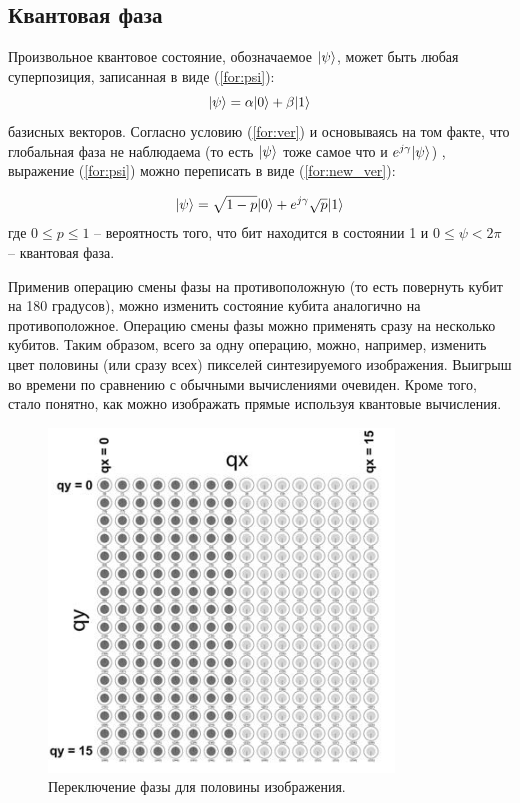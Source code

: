 \subsection{Квантовая фаза}

Произвольное квантовое состояние, обозначаемое $\lvert\psi\rangle$, может быть любая суперпозиция, записанная в виде (\ref{for:psi}):
\begin{equation}
	\label{for:psi}
	\lvert\psi\rangle = \alpha\lvert0\rangle + \beta\lvert1\rangle
\end{equation}
 базисных векторов. Согласно условию (\ref{for:ver}) и основываясь на том факте, что глобальная фаза не наблюдаема (то есть $\lvert\psi\rangle$ тоже самое что и $e^{j\gamma}\lvert\psi\rangle$) \cite{global-phase}, выражение (\ref{for:psi}) можно переписать в виде (\ref{for:new_ver}):
 
\begin{equation} 
	\label{for:new_ver}
	\lvert\psi\rangle = \sqrt{1 - p}\lvert0\rangle + e^{j\gamma}\sqrt{p}\lvert1\rangle
\end{equation} где $0 \leq p \leq 1$ -- вероятность того, что бит находится в состоянии 1 и $0 \leq \psi < 2\pi$ -- квантовая фаза.

Применив операцию смены фазы на противоположную (то есть повернуть кубит на 180 градусов), можно изменить состояние кубита аналогично на противоположное. Операцию смены фазы можно применять сразу на несколько кубитов. Таким образом, всего за одну операцию, можно, например, изменить цвет половины (или сразу всех) пикселей синтезируемого изображения. Выигрыш во времени по сравнению с обычными вычислениями очевиден. Кроме того, стало понятно, как можно изображать прямые используя квантовые вычисления. 

\begin{figure}[h]
	\begin{center}
		\includegraphics[scale=0.7]{img/holst_02.png}
	\end{center}
	\captionsetup{justification=centering}
	\caption{Переключение фазы для половины изображения.}
	\label{img:holst_02}
\end{figure}


